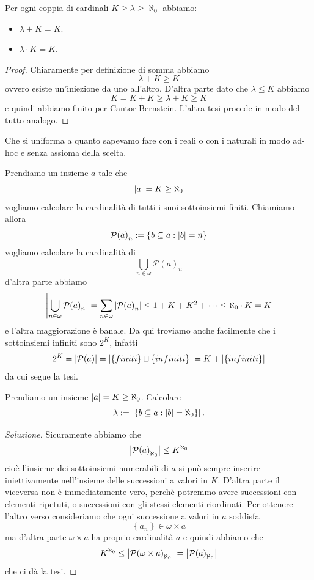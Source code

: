 \documentclass[11pt]{scrartcl}
\newcommand{\parti}[1]{\mathcal{P}\!\left(#1\right)}
\begin{document}
 	\begin{corollary}
 		Per ogni coppia di cardinali $K\ge \lambda\ge \aleph_0$ abbiamo:
 		\begin{itemize}
 			\item $\lambda+K=K$.
 			\item $\lambda\cdot K=K$.
 		\end{itemize}
 	\end{corollary}
 	\begin{proof}
 		Chiaramente per definizione di somma abbiamo
 		$$\lambda+K\ge K$$
 		ovvero esiste un'iniezione da uno all'altro. D'altra parte dato che $\lambda\le K$ abbiamo
 		$$K=K+K\ge \lambda+K\ge K$$
 		e quindi abbiamo finito per Cantor-Bernstein. L'altra tesi procede in modo del tutto analogo.
 	\end{proof}
 	Che si uniforma a quanto sapevamo fare con i reali o con i naturali in modo ad-hoc e senza assioma della scelta.
 	\begin{example}
 		Prendiamo un insieme $a$ tale che
 		$$\left\lvert a \right\rvert=K\ge \aleph_0$$
 		vogliamo calcolare la cardinalità di tutti i suoi sottoinsiemi finiti. Chiamiamo allora
 		$$\parti{a}_n:=\left\{b\subseteq a:\abs{b}=n\right\}$$
 		vogliamo calcolare la cardinalità di 
 		$$\bigcup_{n\in \omega}\parti{a}_n$$
 		d'altra parte abbiamo
 		$$\abs{\bigcup_{n\in \omega}\parti{a}_n}=\sum_{n\in\omega}\abs{\parti{a}_n}\le 1+K+K^2+\dots\le \aleph_0\cdot K=K$$
 		e l'altra maggiorazione è banale. Da qui troviamo anche facilmente che i sottoinsiemi infiniti sono $2^K$, infatti
 		$$2^K=\abs{\parti{a}}=\abs{\left\{finiti\right\}\sqcup \left\{infiniti\right\}}=K+\abs{\left\{infiniti\right\}}$$
 		da cui segue la tesi.
 	\end{example}
 	\begin{example}
 		Prendiamo un insieme $\left\lvert a \right\rvert=K\ge \aleph_0$. Calcolare
 		$$\lambda:=\left\lvert \left\{b\subseteq a:\left\lvert b \right\rvert=\aleph_0\right\} \right\rvert.$$
 	\end{example}
 	\begin{proof}[Soluzione]
 		Sicuramente abbiamo che
 		$$\abs{\parti{a}_{\aleph_0}}\le K^{\aleph_0}$$
 		cioè l'insieme dei sottoinsiemi numerabili di $a$ si può sempre inserire iniettivamente nell'insieme delle successioni a valori in $K$. D'altra parte il viceversa non è immediatamente vero, perchè potremmo avere successioni con elementi ripetuti, o successioni con gli stessi elementi riordinati. Per ottenere l'altro verso consideriamo che ogni successione a valori in $a$ soddisfa
 		$$\left\{a_n\right\}\in \omega\times a$$
 		ma d'altra parte $\omega\times a$ ha proprio cardinalità $a$ e quindi abbiamo che 
 		$$K^{\aleph_0}\le \abs{\parti{\omega \times a}_{\aleph_0}}=\abs{\parti{a}_{\aleph_0}}$$
 		che ci dà la tesi.
 	\end{proof}
\end{document}
